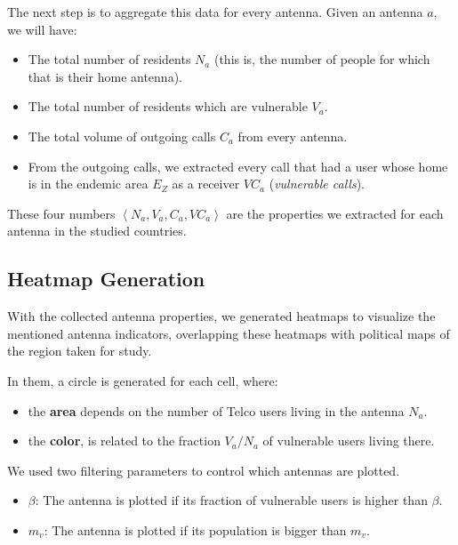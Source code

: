 The next step is to aggregate this data for every antenna. Given an antenna $a$, we will have:
\begin{itemize}
	\item The total number of residents $N_a$ (this is, the number of people for which that is their home antenna).
	\item The total number of residents which are vulnerable $V_a$.
	\item The total volume of outgoing calls $C_a$ from every antenna.
	\item From the outgoing calls, we extracted every call that had a user whose home is in the endemic area $E_Z$ as a receiver $VC_a$ (\textit{vulnerable calls}).
\end{itemize}

These four numbers $\left< N_a, V_a, C_a, VC_a \right>$ are the properties we extracted for each antenna in the studied countries.


\subsection{Heatmap Generation}
With the collected antenna properties, we generated heatmaps to visualize the mentioned antenna indicators, overlapping these heatmaps with political maps of the region taken for study.

In them, a circle is generated for each cell, where:
\begin{itemize}
	\item the \textbf{area} depends on the number of Telco users living in the antenna $N_a$.
	\item the \textbf{color}, is related to the fraction ${V_a}/{N_a}$ of vulnerable users living there.
\end{itemize}

%

We used two filtering parameters to control which antennas are plotted.
\begin{itemize}
	\item $\beta$: The antenna is plotted if its fraction of vulnerable users is higher than $\beta$.
	\item $m_v$: The antenna is plotted if its population is bigger than $m_v$.
\end{itemize}

